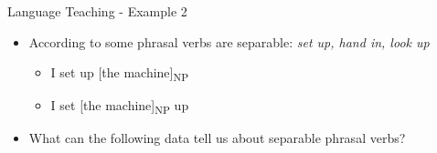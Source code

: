 \documentclass{beamer}
\begin{document}
\begin{frame}{Language Teaching - Example 2}
    \begin{itemize}
        \item According to \cite{cowan_teachers_2008} some phrasal verbs are separable: \textit{set up, hand in, look up}
        \begin{itemize}
        \item I set up {[}the machine{]}\textsubscript{NP}
        \item I set {[}the machine{]}\textsubscript{NP} up 
        \end{itemize}
        \item What can the following data tell us about separable phrasal verbs?
    \end{itemize}
        \begin{columns}
        \begin{column}{5cm}
        \begin{table}
    \centering
    \caption{set up + NP}
    \end{table}
        

\end{column}
\end{columns}
\end{frame}
\end{document}
